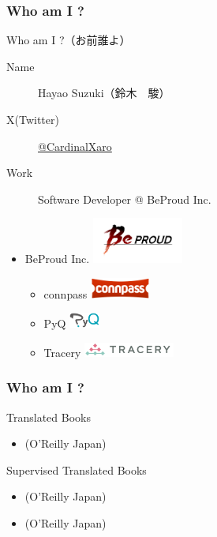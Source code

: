 \documentclass[aspectratio=169,dvipdfmx,12pt,notheorems]{beamer}
\theoremstyle{definition}
\begin{document}
\begin{frame}\frametitle{Who am I ?}

\begin{block}{Who am I ?（お前誰よ）}
\begin{description}
\item[Name] Hayao Suzuki（鈴木　駿）
\item[X(Twitter)] \href{https://twitter.com/CardinalXaro}{@CardinalXaro}
\item[Work] Software Developer @ BeProud Inc.
\end{description}
\end{block}

\begin{center}
\begin{itemize}
\item BeProud Inc. \includegraphics[width=3cm]{bplogo.png}
\begin{itemize}
\item connpass \includegraphics[width=2cm]{connpass_logo_1.png}
\item PyQ \includegraphics[width=1cm]{pyq_logo_color.png}
\item Tracery \includegraphics[width=3cm]{tracery.png}
\end{itemize}
\end{itemize}
\end{center}

\end{frame}

\begin{frame}\frametitle{Who am I ?}

\begin{block}{Translated Books}
\begin{itemize}
\item {}(O'Reilly Japan) 
\end{itemize}
\end{block}

\begin{block}{Supervised Translated Books}
\begin{itemize}
\item {}(O'Reilly Japan)
\item {}(O'Reilly Japan)
\end{itemize}
\end{block}

\end{frame}
\end{document}
